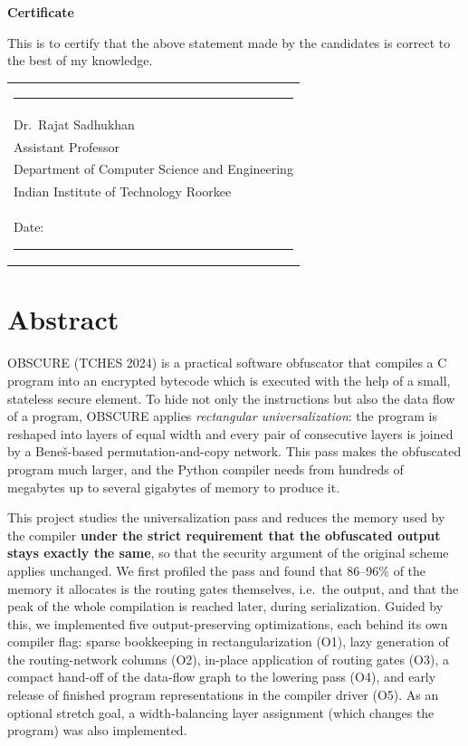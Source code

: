 \documentclass[12pt,a4paper,oneside]{report}
\begin{document}
\vspace{1.0cm}
\begin{center}{\large\bfseries Certificate}\end{center}
This is to certify that the above statement made by the candidates is correct to the best of my
knowledge.

\vspace{1.6cm}
\begin{tabular}{@{}l@{}}
\rule{5.5cm}{0.4pt}\\[2pt]
Dr.~Rajat Sadhukhan\\
Assistant Professor\\
Department of Computer Science and Engineering\\
Indian Institute of Technology Roorkee\\
Date: \rule{3cm}{0.4pt}
\end{tabular}

\chapter*{Abstract}
OBSCURE (TCHES 2024) is a practical software obfuscator that compiles a C program into an
encrypted bytecode which is executed with the help of a small, stateless secure element. To hide
not only the instructions but also the data flow of a program, OBSCURE applies
\emph{rectangular universalization}: the program is reshaped into layers of equal width and every
pair of consecutive layers is joined by a Bene\v{s}-based permutation-and-copy network. This pass
makes the obfuscated program much larger, and the Python compiler needs from hundreds of
megabytes up to several gigabytes of memory to produce it.

This project studies the universalization pass and reduces the memory used by the compiler
\textbf{under the strict requirement that the obfuscated output stays exactly the same}, so that
the security argument of the original scheme applies unchanged. We first profiled the pass and
found that 86--96\% of the memory it allocates is the routing gates themselves, i.e.\ the output,
and that the peak of the whole compilation is reached later, during serialization. Guided by this,
we implemented five output-preserving optimizations, each behind its own compiler flag: sparse
bookkeeping in rectangularization (O1), lazy generation of the routing-network columns (O2),
in-place application of routing gates (O3), a compact hand-off of the data-flow graph to the
lowering pass (O4), and early release of finished program representations in the compiler driver
(O5). As an optional stretch goal, a width-balancing layer assignment (which changes the program)
was also implemented.
\end{document}
